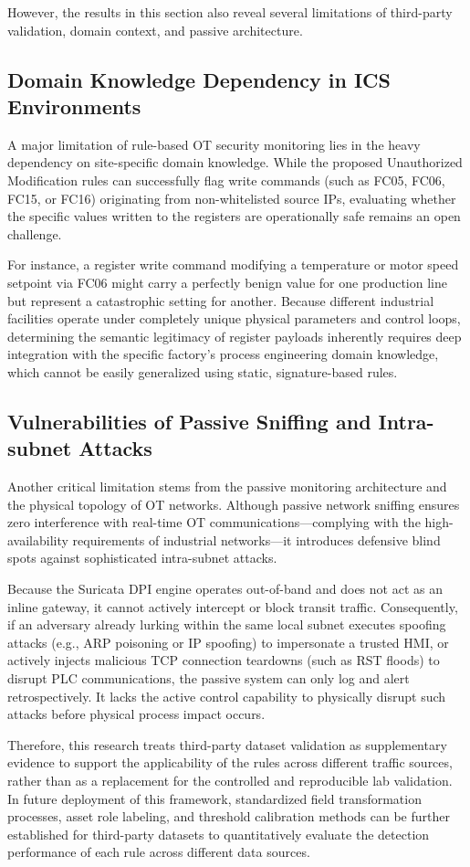 However, the results in this section also reveal several limitations of third-party validation, domain context, and passive architecture.

\subsection{Domain Knowledge Dependency in ICS Environments}
A major limitation of rule-based OT security monitoring lies in the heavy dependency on site-specific domain knowledge. While the proposed Unauthorized Modification rules can successfully flag write commands (such as FC05, FC06, FC15, or FC16) originating from non-whitelisted source IPs, evaluating whether the specific values written to the registers are operationally safe remains an open challenge. 

For instance, a register write command modifying a temperature or motor speed setpoint via FC06 might carry a perfectly benign value for one production line but represent a catastrophic setting for another. Because different industrial facilities operate under completely unique physical parameters and control loops, determining the semantic legitimacy of register payloads inherently requires deep integration with the specific factory's process engineering domain knowledge, which cannot be easily generalized using static, signature-based rules.

\subsection{Vulnerabilities of Passive Sniffing and Intra-subnet Attacks}
Another critical limitation stems from the passive monitoring architecture and the physical topology of OT networks. Although passive network sniffing ensures zero interference with real-time OT communications—complying with the high-availability requirements of industrial networks—it introduces defensive blind spots against sophisticated intra-subnet attacks. 

Because the Suricata DPI engine operates out-of-band and does not act as an inline gateway, it cannot actively intercept or block transit traffic. Consequently, if an adversary already lurking within the same local subnet executes spoofing attacks (e.g., ARP poisoning or IP spoofing) to impersonate a trusted HMI, or actively injects malicious TCP connection teardowns (such as RST floods) to disrupt PLC communications, the passive system can only log and alert retrospectively. It lacks the active control capability to physically disrupt such attacks before physical process impact occurs.

Therefore, this research treats third-party dataset validation as supplementary evidence to support the applicability of the rules across different traffic sources, rather than as a replacement for the controlled and reproducible lab validation. In future deployment of this framework, standardized field transformation processes, asset role labeling, and threshold calibration methods can be further established for third-party datasets to quantitatively evaluate the detection performance of each rule across different data sources.


